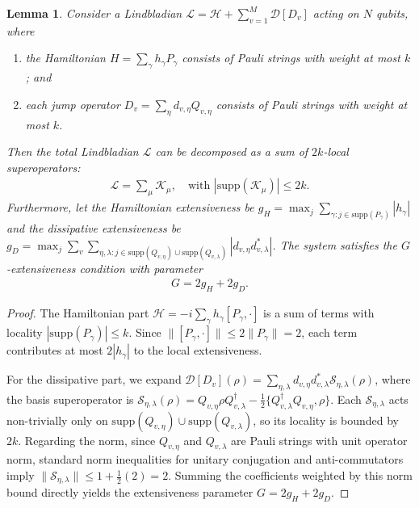 \documentclass[11pt]{article}
\newtheorem{lemma}{Lemma}
\newcommand{\supp}{\mathrm{supp}}
\begin{document}
\begin{lemma}
\label{lem:lindblad-mapping}
    Consider a Lindbladian $\mathcal{L} = \mathcal{H} + \sum_{v=1}^M \mathcal{D}[D_v]$ acting on $N$ qubits, where
    \begin{enumerate}
        \item the Hamiltonian $H = \sum_{\gamma} h_\gamma P_\gamma$ consists of Pauli strings with weight at most $k$; and 
        \item each jump operator $D_v = \sum_{\eta} d_{v,\eta} Q_{v,\eta}$ consists of Pauli strings with weight at most $k$.
    \end{enumerate}
    Then the total Lindbladian $\mathcal{L}$ can be decomposed as a sum of \emph{$2k$-local superoperators}:
    \begin{align*}
        \mathcal{L} = \sum_{\mu} \mathcal{K}_\mu, \quad \text{with } |\supp(\mathcal{K}_\mu)| \le 2k.
    \end{align*}
    Furthermore, let the Hamiltonian extensiveness be $g_H = \max_j \sum_{\gamma: j \in \supp(P_\gamma)} |h_\gamma|$ and the dissipative extensiveness be $g_D = \max_j \sum_{v} \sum_{\eta, \lambda: j \in \supp(Q_{v,\eta}) \cup \supp(Q_{v,\lambda})} |d_{v,\eta} d_{v,\lambda}^*|$.
    The system satisfies the \emph{$G$-extensiveness} condition with parameter
    \begin{align*}
        G = 2 g_H + 2 g_D.
    \end{align*}
\end{lemma}
\begin{proof}
    The Hamiltonian part $\mathcal{H} = -i \sum_\gamma h_\gamma [P_\gamma, \cdot]$ is a sum of terms with locality $|\supp(P_\gamma)| \le k$. Since $\|[P_\gamma, \cdot]\| \le 2\|P_\gamma\| = 2$, each term contributes at most $2|h_\gamma|$ to the local extensiveness.
    
    For the dissipative part, we expand $\mathcal{D}[D_v](\rho) = \sum_{\eta,\lambda} d_{v,\eta}d_{v,\lambda}^* \mathcal{S}_{\eta,\lambda}(\rho)$, where the basis superoperator is $\mathcal{S}_{\eta,\lambda}(\rho) = Q_{v,\eta}\rho Q_{v,\lambda}^\dagger - \frac{1}{2}\{Q_{v,\lambda}^\dagger Q_{v,\eta}, \rho\}$. 
    Each $\mathcal{S}_{\eta,\lambda}$ acts non-trivially only on $\supp(Q_{v,\eta}) \cup \supp(Q_{v,\lambda})$, so its locality is bounded by $2k$.
    Regarding the norm, since $Q_{v,\eta}$ and $Q_{v,\lambda}$ are Pauli strings with unit operator norm, standard norm inequalities for unitary conjugation and anti-commutators imply $\|\mathcal{S}_{\eta,\lambda}\|\le 1 + \frac{1}{2}(2) = 2$.
    Summing the coefficients weighted by this norm bound directly yields the extensiveness parameter $G = 2g_H + 2g_D$.
\end{proof}
\end{document}
